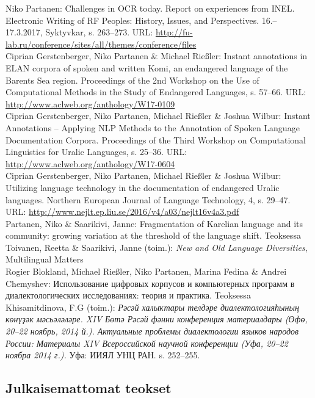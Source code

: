\documentclass[11pt, a4paper]{article}
\newcommand{\years}[1]{\marginnote{\scriptsize #1}} %
\begin{document}
\years{2017} Niko Partanen: Challenges in OCR today. Report on experiences from INEL. Electronic Writing of RF Peoples: History, Issues, and Perspectives. 16.--17.3.2017, Syktyvkar, s. 263--273. URL: \url{http://fu-lab.ru/conference/sites/all/themes/conference/files}\\

\years{2017} Ciprian Gerstenberger, Niko Partanen \& Michael Rießler: Instant annotations in ELAN corpora of spoken and written Komi, an endangered language of the Barents Sea region. Proceedings of the 2nd Workshop on the Use of Computational Methods in the Study of Endangered Languages, s. 57--66. URL: \url{http://www.aclweb.org/anthology/W17-0109}\\

\years{2017} Ciprian Gerstenberger, Niko Partanen, Michael Rießler \& Joshua Wilbur: Instant Annotations -- Applying NLP Methods to the Annotation of Spoken Language Documentation Corpora. Proceedings of the Third Workshop on Computational Linguistics for Uralic Languages, s. 25--36. URL: \url{http://www.aclweb.org/anthology/W17-0604}\\

\years{2016} Ciprian Gerstenberger, Niko Partanen, Michael Rießler \& Joshua Wilbur: Utilizing language technology in the documentation of endangered Uralic languages. Northern European Journal of Language Technology, 4, s. 29--47. URL: \url{http://www.nejlt.ep.liu.se/2016/v4/a03/nejlt16v4a3.pdf} \\

\years{2016} Partanen, Niko \& Saarikivi, Janne: Fragmentation of Karelian language and its community: growing variation at the threshold of the language shift. Teoksessa Toivanen, Reetta \& Saarikivi, Janne (toim.): \emph{New and Old Language Diversities}, Multilingual Matters\\

\years{2014} Rogier Blokland, Michael Rießler, Niko Partanen, Marina Fedina \& Andrei Chemyshev: Использование цифровых корпусов и компьютерных программ в диалектологических исследованиях: теория и практика. Teoksessa Khisamitdinova, F.G (toim.): \emph{Рәсәй халыҡтары телдәре диалектологияһының көнүҙәк мәсьәләләре. XIV Бөтә Рәсәй фәнни конференция материалдары (Өфө, 20--22 ноябрь, 2014 й.). Актуальные проблемы диалектологии языков народов России: Материалы XIV Всероссийской научной конференции (Уфа, 20--22 ноябра 2014 г.).} Уфа: ИИЯЛ УНЦ РАН. s. 252--255.\\

\subsection*{Julkaisemattomat teokset}
\end{document}
